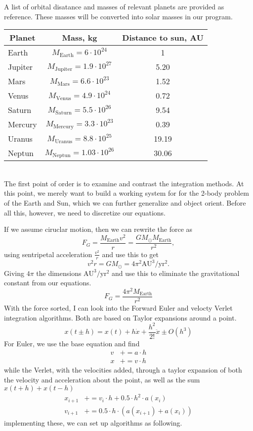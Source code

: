\documentclass[10pt, twocolumn]{revtex4-1}
\begin{document}
A list of orbital disatance and masses of relevant planets are provided as reference. \cite{project3pdf} These masses will be converted
into solar masses in our program. \\

\begin{tabular}{lcc}
\hline
\multicolumn{1}{c}{ Planet } & \multicolumn{1}{c}{ Mass, kg } & \multicolumn{1}{c}{ Distance to sun, AU } \\
\hline
Earth   & $M_{\mathrm{Earth}}=6\cdot 10^{24}$       & 1             \\
Jupiter & $M_{\mathrm{Jupiter}}=1.9\cdot 10^{27}$   & 5.20          \\
Mars    & $M_{\mathrm{Mars}}=6.6\cdot 10^{23}$      & 1.52          \\
Venus   & $M_{\mathrm{Venus}}=4.9\cdot 10^{24}$     & 0.72          \\
Saturn  & $M_{\mathrm{Saturn}}=5.5\cdot 10^{26}$    & 9.54          \\
Mercury & $M_{\mathrm{Mercury}}=3.3\cdot 10^{23}$   & 0.39          \\
Uranus  & $M_{\mathrm{Uranus}}=8.8\cdot 10^{25}$    & 19.19         \\
Neptun  & $M_{\mathrm{Neptun}}=1.03\cdot 10^{26}$   & 30.06         \\
\hline
\end{tabular}\\

The first point of order is to examine and contrast the integration methods. At this point, we merely want to build a working 
system for for the 2-body problem of the Earth and Sun, which we can further generalize and object orient. Before all this, however,
we need to discretize our equations. 

If we assume ciruclar motion, then we can rewrite the force as 
\[
F_G= \frac{M_{\mathrm{Earth}}v^2}{r}=\frac{GM_{\odot}M_{\mathrm{Earth}}}{r^2},
\]
using sentripetal acceleration $\frac{v^2}{r}$ and use this to get 
\[
v^2r=GM_{\odot}=4\pi^2\mathrm{AU}^3/\mathrm{yr}^2.
\]
Giving $4\pi$ the dimensions $\mathrm{AU}^3/\mathrm{yr}^2$ and use this to eliminate the gravitational constant from our equations. 
\[ F_G = \frac{4\pi^2 M_{\mathrm{Earth}}}{r^2} \]
With the force sorted, I can look into the Forward Euler and velocty Verlet integration algorithms. Both are based on Taylor expansions
around a point. 
\[ x(t \pm h ) = x(t) + h\dot{x} + \frac{h^2}{2!}\ddot{x} \pm O(h^3) \]
For Euler, we use the base equation and find 
\begin{align}
    v &+= a\cdot h \\
    x &+= v\cdot h
\end{align}
while the Verlet, with the velocities added, through a taylor expansion of both the velocity and acceleration about the point, as well
as the sum $x(t+h) + x(t-h)$
\begin{align}
    x_{i+1} &+= v_i\cdot h + 0.5\cdot h^2 \cdot a(x_i) \\
    v_{i+1} &+= 0.5 \cdot h \cdot (a(x_{i+1}) + a(x_i) )
\end{align}
implementing these, we can set up algorithms as following. 
\end{document}
